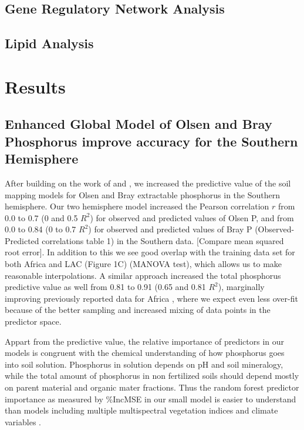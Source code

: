 \subsection*{Gene Regulatory Network Analysis}

\subsection*{Lipid Analysis}

\section{Results}
\subsection{Enhanced Global Model of Olsen and Bray Phosphorus improve accuracy for the Southern Hemisphere}
After building on the work of \cite{hexianjin2022} and \cite{mcdowell2023}, we increased the predictive value of the soil mapping models for Olsen and Bray extractable phosphorus in the Southern hemisphere. Our two hemisphere model increased the Pearson correlation $r$ from 0.0 to 0.7 (0 and 0.5 $R^2$) for observed and predicted values of Olsen P, and  from 0.0 to 0.84 (0 to 0.7 $R^2$) for observed and predicted values of Bray P (Observed-Predicted correlations table 1) in the Southern data.  [Compare mean squared root error]. In addition to this we see good overlap with the training data set for both Africa and LAC (Figure 1C) (MANOVA test), which allows us to make reasonable interpolations. A similar approach increased the total phosphorus predictive value as well from 0.81 to 0.91 (0.65 and 0.81 $R^2$), marginally improving previously reported data for Africa \citep{hengl2017a}, where we expect even less over-fit because of the better sampling and increased mixing of data points in the predictor space.

Appart from the predictive value,  the relative importance of  predictors in our models is congruent with the chemical understanding of how phosphorus goes into soil solution.
Phosphorus in solution depends on pH and soil mineralogy, while the total amount of phosphorus in non fertilized soils should depend mostly on parent material and organic mater fractions.
Thus the random forest predictor importance as measured by \%IncMSE in our small model is easier to understand than models including multiple multispectral vegetation indices and climate variables \citep{mcdowell2023}.

